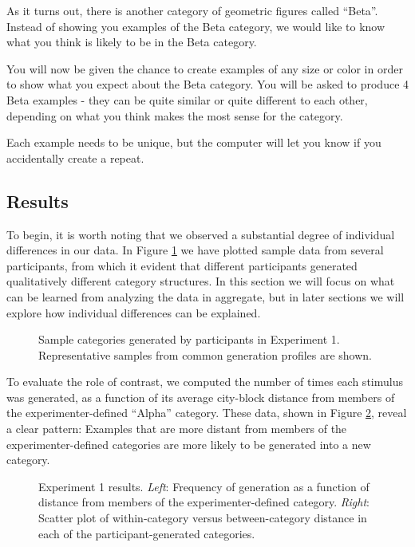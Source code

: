 \documentclass[12pt]{article}
\newcommand\inputpgf[2]{{
\let\pgfimageWithoutPath\pgfimage
\renewcommand{\pgfimage}[2][]{\pgfimageWithoutPath[##1]{#1/##2}}

}}
\begin{document}
\begin{flushleft}
\begin{displayquote}
As it turns out, there is another category of geometric figures called ``Beta''. Instead of showing you examples of the Beta category, we would like to know what you think is likely to be in the Beta category. 

You will now be given the chance to create examples of any size or color in order to show what you expect about the Beta category. You will be asked to produce 4 Beta examples - they can be quite similar or quite different to each other, depending on what you think makes the most sense for the category.

Each example needs to be unique, but the computer will let you know if you accidentally create a repeat.
\end{displayquote}


\subsection{Results}

To begin, it is worth noting that we observed a substantial degree of individual differences in our data. In Figure \ref{fig:e1-samples} we have plotted sample data from several participants, from which it evident that different participants generated qualitatively different category structures. In this section we will focus on what can be learned from analyzing the data in aggregate, but in later sections we will explore how individual differences can be explained.

\begin{figure}
    \begin{center}
    \inputpgf{figs/}{e1-samples.pgf}
    \caption{Sample categories generated by participants in Experiment 1. Representative samples from common generation profiles are shown.}
    \label{fig:e1-samples}
    \end{center}
\end{figure}

To evaluate the role of contrast, we computed the number of times each stimulus was generated, as a function of its average city-block distance from members of the experimenter-defined ``Alpha'' category. These data, shown in Figure \ref{fig:e1-distanceplots}, reveal a clear pattern: Examples that are more distant from members of the experimenter-defined categories are more likely to be generated into a new category. 

\begin{figure}
    \begin{center}
    \inputpgf{figs/}{e1-distanceplots.pgf}
    \caption{Experiment 1 results. {\em Left}: Frequency of generation as a function of distance from members of the experimenter-defined category. {\em Right}: Scatter plot of within-category versus between-category distance in each of the participant-generated categories.}
    \label{fig:e1-distanceplots}
    \end{center}
\end{figure}



\end{flushleft}
\end{document}
